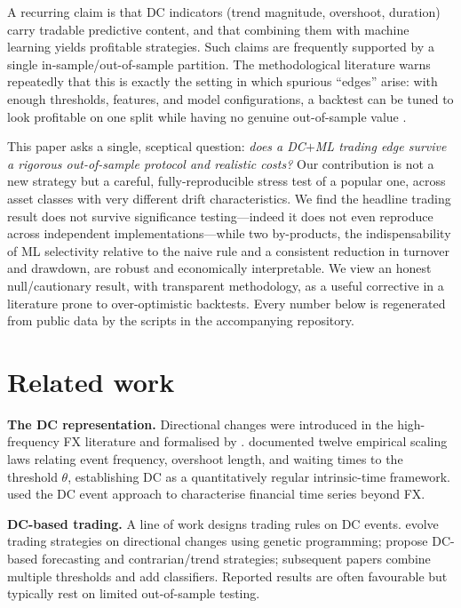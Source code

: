 \documentclass[11pt]{article}
\begin{document}
A recurring claim is that DC indicators (trend magnitude, overshoot, duration)
carry tradable predictive content, and that combining them with machine learning
yields profitable strategies. Such claims are frequently supported by a single
in-sample/out-of-sample partition. The methodological literature warns
repeatedly that this is exactly the setting in which spurious ``edges'' arise:
with enough thresholds, features, and model configurations, a backtest can be
tuned to look profitable on one split while having no genuine out-of-sample
value \citep{bailey2014,harvey2015,arnott2019}.

This paper asks a single, sceptical question: \emph{does a DC$+$ML trading edge
survive a rigorous out-of-sample protocol and realistic costs?} Our contribution
is not a new strategy but a careful, fully-reproducible stress test of a popular
one, across asset classes with very different drift characteristics. We find the
headline trading result does not survive significance testing---indeed it does
not even reproduce across independent implementations---while two by-products,
the indispensability of ML selectivity relative to the naive rule and a
consistent reduction in turnover and drawdown, are robust and economically
interpretable. We view an honest null/cautionary result, with transparent
methodology, as a useful corrective in a literature prone to over-optimistic
backtests. Every number below is regenerated from public data by the scripts in
the accompanying repository.

\section{Related work}
\textbf{The DC representation.} Directional changes were introduced in the
high-frequency FX literature \citep{guillaume1997} and formalised by
\citet{tsang2010}. \citet{glattfelder2011} documented twelve empirical scaling
laws relating event frequency, overshoot length, and waiting times to the
threshold $\theta$, establishing DC as a quantitatively regular intrinsic-time
framework. \citet{aloud2012} used the DC event approach to characterise
financial time series beyond FX.

\textbf{DC-based trading.} A line of work designs trading rules on DC events.
\citet{kampouridis2017} evolve trading strategies on directional changes using
genetic programming; \citet{bakhach2018} propose DC-based forecasting and
contrarian/trend strategies; subsequent papers combine multiple thresholds and
add classifiers. Reported results are often favourable but typically rest on
limited out-of-sample testing.
\end{document}
